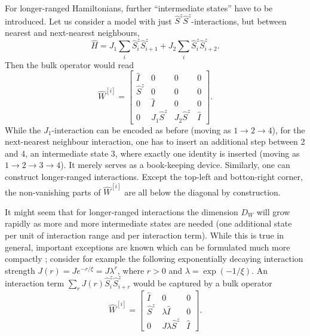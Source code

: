 For longer-ranged Hamiltonians, further ``intermediate states'' have to be introduced. Let us consider a model with just $\hat{S}^z \hat{S}^z$-interactions, but between nearest and next-nearest neighbours,
\begin{equation}
\hat{H} = J_1 \sum_{i} \hat{S}^z_i \hat{S}^z_{i+1} + J_2 \sum_{i} \hat{S}^z_i \hat{S}^z_{i+2} .
\end{equation}
Then the bulk operator would read
\begin{equation}
\hat{W}^{[i]} = \left[
\begin{array}{cccc}
\hat{I} & 0 & 0 & 0 \\
\hat{S}^z & 0 & 0 & 0 \\
0 & \hat{I} & 0 & 0 \\
0 & J_1\hat{S}^z & J_2\hat{S}^z & \hat{I}
\end{array}
\right] .
\end{equation}
While the $J_1$-interaction can be encoded as before (moving as $1 \rightarrow 2 \rightarrow 4$), for the next-nearest neighbour interaction, one has to insert an additional step between 2 and 4, an intermediate state 3, where exactly one identity is inserted (moving as $1 \rightarrow 2 \rightarrow 3 \rightarrow 4$). It merely serves as a book-keeping device. Similarly, one can construct longer-ranged interactions. Except the top-left and botton-right corner, the non-vanishing parts of $\hat{W}^{[i]}$ are all below the diagonal by construction.

It might seem that for longer-ranged interactions the dimension $D_W$ will grow rapidly as more and more intermediate states are needed (one additional state per unit of interaction range and per interaction term). While this is true in general, important exceptions are known which can be formulated much more compactly \cite{Frowis10,Crosswhite08a}; consider for example the following exponentially decaying interaction strength $J(r)=J e^{-r/\xi} = J \lambda^r$, where $r>0$ and $\lambda = \exp(-1/\xi)$. An interaction term $\sum_r J(r)\hat{S}^z_i \hat{S}^z_{i+r}$ would be captured by a bulk operator
\begin{equation}
\hat{W}^{[i]} = \left[
\begin{array}{ccc}
\hat{I} & 0 & 0  \\
\hat{S}^z & \lambda\hat{I} & 0  \\
0 & J\lambda \hat{S}^z & \hat{I}
\end{array}
\right] .
\end{equation}

